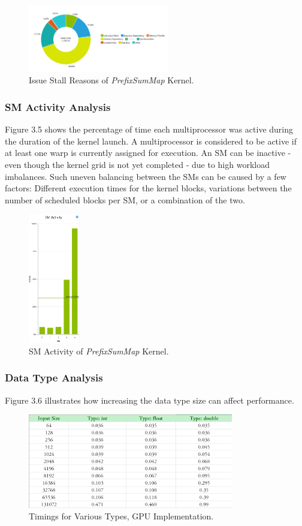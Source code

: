 \documentclass[12pt]{article}
\numberwithin{equation}{section}
\numberwithin{table}{section}
\numberwithin{figure}{section}
\begin{document}
\begin{figure}[!h]\centering
	\includegraphics[width=0.55\textwidth]{3_3.png}
	\caption{Issue Stall Reasons of \textit{PrefixSumMap} Kernel.}
	\label{pl1}
\end{figure}

\subsubsection{SM Activity Analysis}
Figure 3.5 shows the percentage of time each multiprocessor was active during the duration of the kernel launch. A multiprocessor is considered to be active if at least one warp is currently assigned for execution. An SM can be inactive - even though the kernel grid is not yet completed - due to high workload imbalances. Such uneven balancing between the SMs can be caused by a few factors: Different execution times for the kernel blocks, variations between the number of scheduled blocks per SM, or a combination of the two.
\begin{figure}[!h]\centering
	\includegraphics[width=0.2\textwidth]{3_4.png}
	\caption{SM Activity of \textit{PrefixSumMap} Kernel.}
	\label{pl1}
\end{figure}

\subsubsection{Data Type Analysis}
Figure 3.6 illustrates how increasing the data type size can affect performance.
\begin{figure}[!h]\centering
	\includegraphics[width=0.8\textwidth]{3_6.png}
	\caption{Timings for Various Types, GPU Implementation.}
	\label{pl1}
\end{figure}
\end{document}

